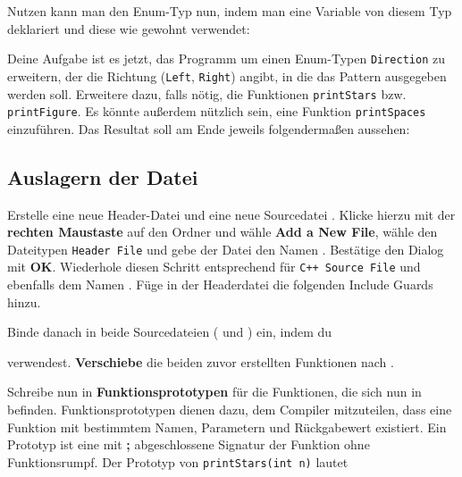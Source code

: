 
Nutzen kann man den Enum-Typ nun, indem man eine Variable von diesem Typ deklariert und diese wie gewohnt verwendet:


Deine Aufgabe ist es jetzt, das Programm um einen Enum-Typen \lstinline{Direction} zu erweitern, der die Richtung (\lstinline{Left}, \lstinline{Right}) angibt, in die das Pattern ausgegeben werden soll.
Erweitere dazu, falls nötig, die Funktionen \lstinline{printStars} bzw. \lstinline{printFigure}. Es könnte außerdem nützlich sein, eine Funktion \lstinline{printSpaces} einzuführen.
Das Resultat soll am Ende jeweils folgendermaßen aussehen:


\subsection{Auslagern der Datei}
Erstelle eine neue Header-Datei \textbf{} und eine neue
Sourcedatei \textbf{}.
Klicke hierzu mit der \textbf{rechten Maustaste} auf den Ordner \textbf{} und wähle \textbf{Add a New File}, wähle den Dateitypen \texttt{Header File} und gebe der Datei den Namen . 
Bestätige den Dialog mit \textbf{OK}.
Wiederhole diesen Schritt entsprechend für \texttt{C++ Source File} und ebenfalls dem Namen .
Füge in der Headerdatei die folgenden Include Guards hinzu.


Binde danach  in beide Sourcedateien ( und ) ein, indem du


verwendest.
\textbf{Verschiebe} die beiden zuvor erstellten Funktionen nach .

Schreibe nun in  \textbf{Funktionsprototypen} für die Funktionen, die sich nun in  befinden.
Funktionsprototypen dienen dazu, dem Compiler mitzuteilen, dass eine Funktion mit bestimmtem Namen, Parametern und Rückgabewert existiert.
Ein Prototyp ist eine mit \textbf{;} abgeschlossene Signatur der Funktion ohne Funktionsrumpf.
Der Prototyp von \lstinline{printStars(int n)} lautet 


